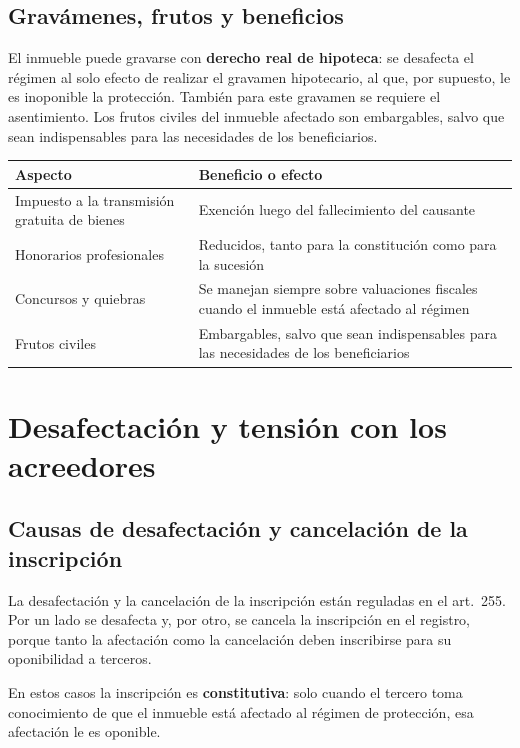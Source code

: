 \documentclass[12pt,oneside]{book}
\begin{document}
\subsection{Gravámenes, frutos y beneficios}

El inmueble puede gravarse con \textbf{derecho real de hipoteca}: se desafecta el régimen al solo efecto de realizar el gravamen hipotecario, al que, por supuesto, le es inoponible la protección. También para este gravamen se requiere el asentimiento. Los frutos civiles del inmueble afectado son embargables, salvo que sean indispensables para las necesidades de los beneficiarios.

\begin{table}[H]
\centering
\begin{tabularx}{\textwidth}{@{}>{\raggedright\arraybackslash}p{}>{\raggedright\arraybackslash}X@{}}
\toprule
\textbf{Aspecto} & \textbf{Beneficio o efecto} \\
\midrule
Impuesto a la transmisión gratuita de bienes & Exención luego del fallecimiento del causante \\
Honorarios profesionales & Reducidos, tanto para la constitución como para la sucesión \\
Concursos y quiebras & Se manejan siempre sobre valuaciones fiscales cuando el inmueble está afectado al régimen \\
Frutos civiles & Embargables, salvo que sean indispensables para las necesidades de los beneficiarios \\
\bottomrule
\end{tabularx}
\end{table}

\section{Desafectación y tensión con los acreedores}

\subsection{Causas de desafectación y cancelación de la inscripción}

La desafectación y la cancelación de la inscripción están reguladas en el art.~255. Por un lado se desafecta y, por otro, se cancela la inscripción en el registro, porque tanto la afectación como la cancelación deben inscribirse para su oponibilidad a terceros.

\begin{importante}
En estos casos la inscripción es \textbf{constitutiva}: solo cuando el tercero toma conocimiento de que el inmueble está afectado al régimen de protección, esa afectación le es oponible.
\end{importante}
\end{document}
